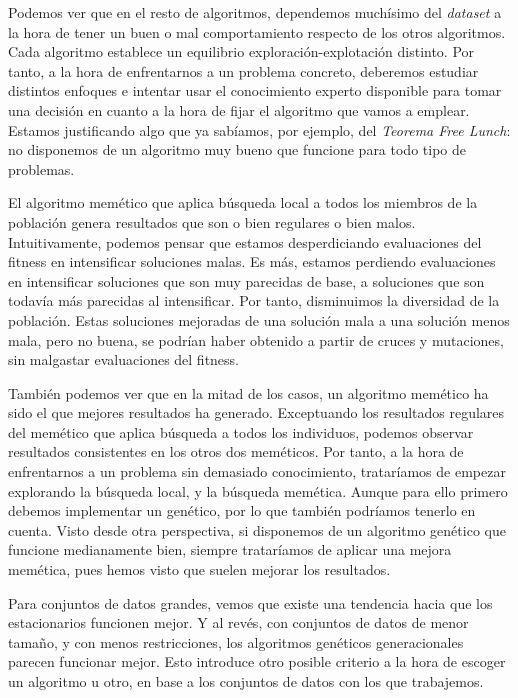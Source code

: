 \documentclass[11pt]{article}
\begin{document}


Podemos ver que en el resto de algoritmos, dependemos muchísimo del \emph{dataset} a la hora de tener un buen o mal comportamiento respecto de los otros algoritmos. Cada algoritmo establece un equilibrio exploración-explotación distinto. Por tanto, a la hora de enfrentarnos a un problema concreto, deberemos estudiar distintos enfoques e intentar usar el conocimiento experto disponible para tomar una decisión en cuanto a la hora de fijar el algoritmo que vamos a emplear. Estamos justificando algo que ya sabíamos, por ejemplo, del \emph{Teorema Free Lunch}: no disponemos de un algoritmo muy bueno que funcione para todo tipo de problemas.

El algoritmo memético que aplica búsqueda local a todos los miembros de la población genera resultados que son o bien regulares o bien malos. Intuitivamente, podemos pensar que estamos desperdiciando evaluaciones del fitness en intensificar soluciones malas. Es más, estamos perdiendo evaluaciones en intensificar soluciones que son muy parecidas de base, a soluciones que son todavía más parecidas al intensificar. Por tanto, disminuimos la diversidad de la población. Estas soluciones mejoradas de una solución mala a una solución menos mala, pero no buena, se podrían haber obtenido a partir de cruces y mutaciones, sin malgastar evaluaciones del fitness.

También podemos ver que en la mitad de los casos, un algoritmo memético ha sido el que mejores resultados ha generado. Exceptuando los resultados regulares del memético que aplica búsqueda a todos los individuos, podemos observar resultados consistentes en los otros dos meméticos. Por tanto, a la hora de enfrentarnos a un problema sin demasiado conocimiento, trataríamos de empezar explorando la búsqueda local, y la búsqueda memética. Aunque para ello primero debemos implementar un genético, por lo que también podríamos tenerlo en cuenta. Visto desde otra perspectiva, si disponemos de un algoritmo genético que funcione medianamente bien, siempre trataríamos de aplicar una mejora memética, pues hemos visto que suelen mejorar los resultados.

Para conjuntos de datos grandes, vemos que existe una tendencia hacia que los estacionarios funcionen mejor. Y al revés, con conjuntos de datos de menor tamaño, y con menos restricciones, los algoritmos genéticos generacionales parecen funcionar mejor. Esto introduce otro posible criterio a la hora de escoger un algoritmo u otro, en base a los conjuntos de datos con los que trabajemos.
\end{document}
